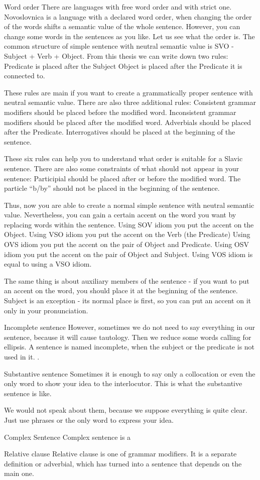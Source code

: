 Word order
There are languages with free word order and with strict one. Novoslovnica is a language with a declared word order, when changing the order of the words shifts a semantic value of the whole sentence. However, you can change some words in the sentences as you like. Let us see what the order is.
The common structure of simple sentence with neutral semantic value is SVO - Subject + Verb + Object. From this thesis we can write down two rules:
Predicate is placed after the Subject
Object is placed after the Predicate it is connected to.

These rules are main if you want to create a grammatically proper sentence with neutral semantic value. There are also three additional rules:
Consistent grammar modifiers should be placed before the modified word.
Inconsistent grammar modifiers should be placed after the modified word.
Adverbials should be placed after the Predicate.
Interrogatives should be placed at the beginning of the sentence.

These six rules can help you to understand what order is suitable for a Slavic sentence. There are also some constraints of what should not appear in your sentence:
Participial should be placed after or before the modified word.
The particle “b/by” should not be placed in the beginning of the sentence.

Thus, now you are able to create a normal simple sentence with neutral semantic value. Nevertheless, you can gain a certain accent on the word you want by replacing words within the sentence.
Using SOV idiom you put the accent on the Object. 
Using VSO idiom you put the accent on the Verb (the Predicate)
Using OVS idiom you put the accent on the pair of Object and Predicate.
Using OSV idiom you put the accent on the pair of Object and Subject.
Using VOS idiom is equal to using a VSO idiom.

The same thing is about auxiliary members of the sentence - if you want to put an accent on the word, you should place it at the beginning of the sentence. Subject is an exception - its normal place is first, so you can put an accent on it only in your pronunciation.


Incomplete sentence
However, sometimes we do not need to say everything in our sentence, because it will cause tautology. Then we reduce some words calling for ellipsis. A sentence is named incomplete, when the subject or the predicate is not used in it.
.


Substantive sentence
Sometimes it is enough to say only a collocation or even the only word to show your idea to the interlocutor. This is what the substantive sentence is like.

We would not speak about them, because we suppose everything is quite clear. Just use phrases or the only word to express your idea.


Complex Sentence
Complex sentence is a


Relative clause
Relative clause is one of grammar modifiers. It is a separate definition or adverbial, which has turned into a sentence that depends on the main one.
